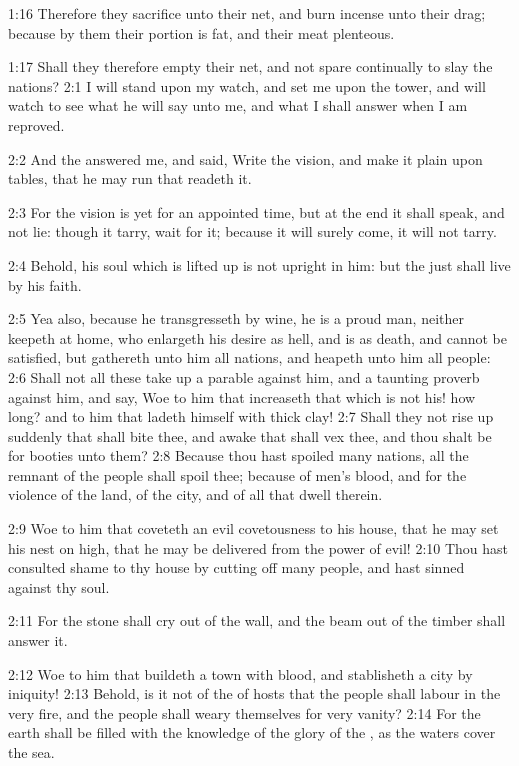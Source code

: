 1:16 Therefore they sacrifice unto their net, and burn incense unto
their drag; because by them their portion is fat, and their meat
plenteous.

1:17 Shall they therefore empty their net, and not spare continually
to slay the nations?  2:1 I will stand upon my watch, and set me upon
the tower, and will watch to see what he will say unto me, and what I
shall answer when I am reproved.

2:2 And the \LORD answered me, and said, Write the vision, and make it
plain upon tables, that he may run that readeth it.

2:3 For the vision is yet for an appointed time, but at the end it
shall speak, and not lie: though it tarry, wait for it; because it
will surely come, it will not tarry.

2:4 Behold, his soul which is lifted up is not upright in him: but the
just shall live by his faith.

2:5 Yea also, because he transgresseth by wine, he is a proud man,
neither keepeth at home, who enlargeth his desire as hell, and is as
death, and cannot be satisfied, but gathereth unto him all nations,
and heapeth unto him all people: 2:6 Shall not all these take up a
parable against him, and a taunting proverb against him, and say, Woe
to him that increaseth that which is not his! how long? and to him
that ladeth himself with thick clay!  2:7 Shall they not rise up
suddenly that shall bite thee, and awake that shall vex thee, and thou
shalt be for booties unto them?  2:8 Because thou hast spoiled many
nations, all the remnant of the people shall spoil thee; because of
men's blood, and for the violence of the land, of the city, and of all
that dwell therein.

2:9 Woe to him that coveteth an evil covetousness to his house, that
he may set his nest on high, that he may be delivered from the power
of evil!  2:10 Thou hast consulted shame to thy house by cutting off
many people, and hast sinned against thy soul.

2:11 For the stone shall cry out of the wall, and the beam out of the
timber shall answer it.

2:12 Woe to him that buildeth a town with blood, and stablisheth a
city by iniquity!  2:13 Behold, is it not of the \LORD of hosts that
the people shall labour in the very fire, and the people shall weary
themselves for very vanity?  2:14 For the earth shall be filled with
the knowledge of the glory of the \LORD, as the waters cover the sea.

